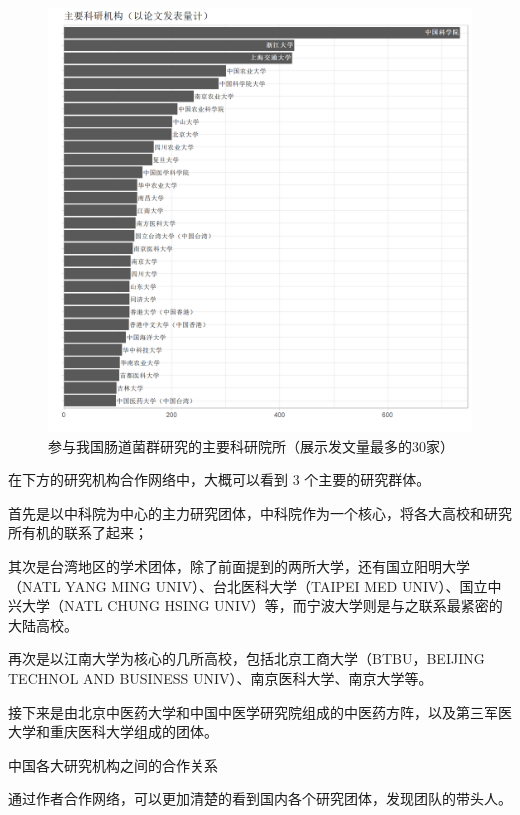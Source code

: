 \documentclass[]{ctexbook}
\begin{document}
\begin{figure}
\includegraphics[width=1\linewidth]{plots/china-top-university-1} \caption{参与我国肠道菌群研究的主要科研院所（展示发文量最多的30家）}\label{fig:china-top-university}
\end{figure}

在下方的研究机构合作网络中，大概可以看到 3 个主要的研究群体。

首先是以中科院为中心的主力研究团体，中科院作为一个核心，将各大高校和研究所有机的联系了起来；

其次是台湾地区的学术团体，除了前面提到的两所大学，还有国立阳明大学（NATL YANG MING UNIV）、台北医科大学（TAIPEI MED UNIV）、国立中兴大学（NATL CHUNG HSING UNIV）等，而宁波大学则是与之联系最紧密的大陆高校。

再次是以江南大学为核心的几所高校，包括北京工商大学（BTBU，BEIJING TECHNOL AND BUSINESS UNIV）、南京医科大学、南京大学等。

接下来是由北京中医药大学和中国中医学研究院组成的中医药方阵，以及第三军医大学和重庆医科大学组成的团体。

\hypertarget{htmlwidget-1f31fde0b74c864a3520}{}

\label{fig:china-aff-col-net}中国各大研究机构之间的合作关系

通过作者合作网络，可以更加清楚的看到国内各个研究团体，发现团队的带头人。
\end{document}
